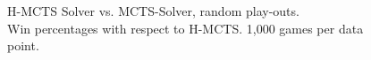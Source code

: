 \begin{figure}[ht]
     \caption[H-MCTS Solver $B$ values]{H-MCTS Solver vs. MCTS-Solver, random play-outs. \\ Win percentages with respect to H-MCTS. 1,000 games per data point.}
     \label{fig:h-mcts-s_v_mcts-s}
\end{figure}

